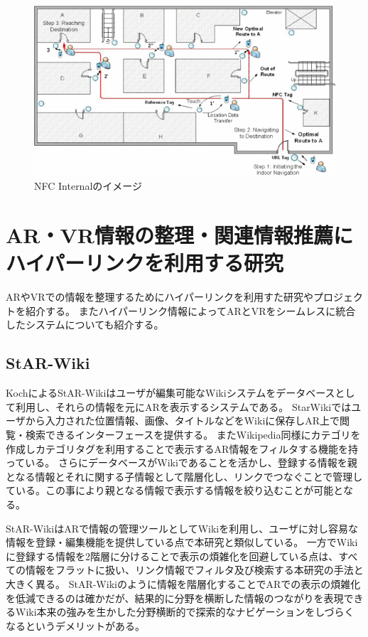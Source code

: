 \begin{figure}[h]
  \centering 
  \includegraphics[width=150mm]{images/NFC_Internal.png}
  \caption{NFC Internalのイメージ} \label{fig:NFC_Internal}
\end{figure}



\section{AR・VR情報の整理・関連情報推薦にハイパーリンクを利用する研究}
ARやVRでの情報を整理するためにハイパーリンクを利用すた研究やプロジェクトを紹介する。
またハイパーリンク情報によってARとVRをシームレスに統合したシステムについても紹介する。

\subsection{StAR-Wiki}
KochによるStAR-Wiki\cite{Koch2014StARWikiA}はユーザが編集可能なWikiシステムをデータベースとして利用し、それらの情報を元にARを表示するシステムである。
StarWikiではユーザから入力された位置情報、画像、タイトルなどをWikiに保存しAR上で閲覧・検索できるインターフェースを提供する。
またWikipedia同様にカテゴリを作成しカテゴリタグを利用することで表示するAR情報をフィルタする機能を持っている。
さらにデータベースがWikiであることを活かし、登録する情報を親となる情報とそれに関する子情報として階層化し、リンクでつなぐことで管理している。この事により親となる情報で表示する情報を絞り込むことが可能となる。

StAR-WikiはARで情報の管理ツールとしてWikiを利用し、ユーザに対し容易な情報を登録・編集機能を提供している点で本研究と類似している。
一方でWikiに登録する情報を2階層に分けることで表示の煩雑化を回避している点は、すべての情報をフラットに扱い、リンク情報でフィルタ及び検索する本研究の手法と大きく異る。
StAR-Wikiのように情報を階層化することでARでの表示の煩雑化を低減できるのは確かだが、結果的に分野を横断した情報のつながりを表現できるWiki本来の強みを生かした分野横断的で探索的なナビゲーションをしづらくなるというデメリットがある。

